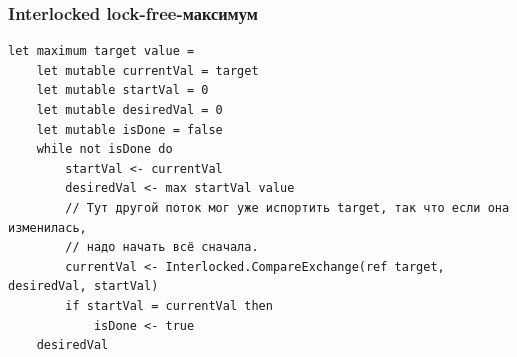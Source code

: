 \documentclass[xetex,mathserif,serif]{beamer}
\begin{document}
	\begin{frame}[fragile]
		\frametitle{Interlocked lock-free-максимум}
		\begin{footnotesize}
			\begin{verbatim}
let maximum target value =
    let mutable currentVal = target
    let mutable startVal = 0
    let mutable desiredVal = 0
    let mutable isDone = false
    while not isDone do
        startVal <- currentVal
        desiredVal <- max startVal value
        // Тут другой поток мог уже испортить target, так что если она изменилась,
        // надо начать всё сначала.
        currentVal <- Interlocked.CompareExchange(ref target, desiredVal, startVal)
        if startVal = currentVal then
            isDone <- true
    desiredVal
			\end{verbatim}
		\end{footnotesize}
\end{frame}
\end{document}
